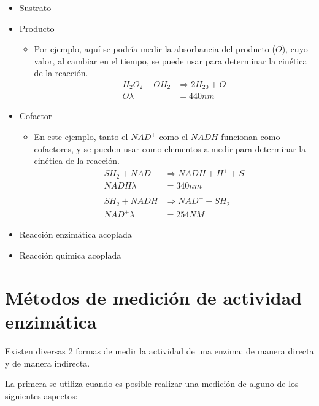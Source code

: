 \begin{itemize}
    \item Sustrato \cite{malairuangHighCellDensity2020}
    \item Producto
        \begin{itemize}
            \item Por ejemplo, aquí se podría medir la absorbancia del producto ($O$), cuyo valor, al cambiar en el tiempo, se puede usar para determinar la cinética de la reacción.
                \begin{align*}
                H_2O_2 + OH_2 &\Longrightarrow 2H_20 + O
                \\
                O \lambda &= 440nm
                \end{align*}
        \end{itemize}
    \item Cofactor
        \begin{itemize}
            \item En este ejemplo, tanto el $NAD^+$ como el $NADH$ funcionan como cofactores, y se pueden usar como elementos a medir para determinar la cinética de la reacción.
                \begin{align*}
                SH_2 + NAD^{+} &\Longrightarrow NADH + H^{+} + S
                \\
                NADH \lambda &= 340nm
                \\
                \\
                SH_2 + NADH &\Longrightarrow NAD^{+} + SH_2
                \\
                NAD^{+} \lambda &= 254NM
                \end{align*}
                
        \end{itemize}
    \item Reacción enzimática acoplada
    \item Reacción química acoplada
\end{itemize}


\section{Métodos de medición de actividad enzimática}

Existen diversas 2 formas de medir la actividad de una enzima: de manera directa y de manera indirecta.\cite{somboonSimpleGreenMethod2022}

La primera se utiliza cuando es posible realizar una medición de alguno de los siguientes aspectos:

